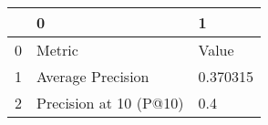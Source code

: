 \begin{tabular}{lll}
\toprule
{} &                       0 &         1 \\
\midrule
0 &                  Metric &     Value \\
1 &       Average Precision &  0.370315 \\
2 &  Precision at 10 (P@10) &       0.4 \\
\bottomrule
\end{tabular}
